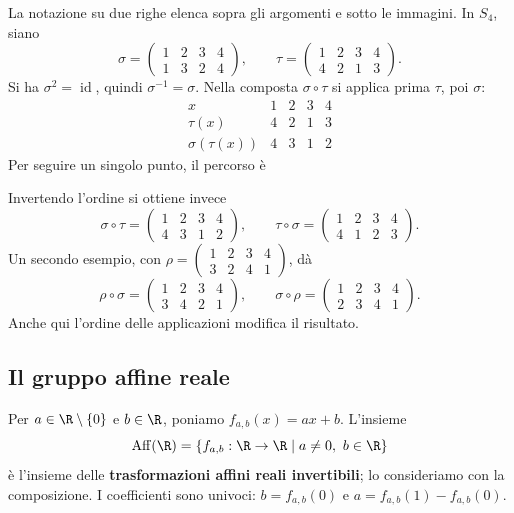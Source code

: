 \begin{esempio}
La notazione su due righe elenca sopra gli argomenti e sotto le immagini. In $S_4$, siano
\[
\sigma=\begin{pmatrix}1&2&3&4\\1&3&2&4\end{pmatrix},\qquad
\tau=\begin{pmatrix}1&2&3&4\\4&2&1&3\end{pmatrix}.
\]
Si ha $\sigma^2=\operatorname{id}$, quindi $\sigma^{-1}=\sigma$. Nella composta $\sigma\circ\tau$ si applica prima $\tau$, poi $\sigma$:
\[
\begin{array}{c|rrrr}
x&1&2&3&4\\\hline
\tau(x)&4&2&1&3\\
\sigma(\tau(x))&4&3&1&2
\end{array}
\]
Per seguire un singolo punto, il percorso è
\begin{center}
\end{center}
Invertendo l'ordine si ottiene invece
\[
\sigma\circ\tau=\begin{pmatrix}1&2&3&4\\4&3&1&2\end{pmatrix},\qquad
\tau\circ\sigma=\begin{pmatrix}1&2&3&4\\4&1&2&3\end{pmatrix}.
\]
Un secondo esempio, con $\rho=\left(\begin{smallmatrix}1&2&3&4\\3&2&4&1\end{smallmatrix}\right)$, dà
\[
\rho\circ\sigma=\begin{pmatrix}1&2&3&4\\3&4&2&1\end{pmatrix},\qquad
\sigma\circ\rho=\begin{pmatrix}1&2&3&4\\2&3&4&1\end{pmatrix}.
\]
Anche qui l'ordine delle applicazioni modifica il risultato.
\end{esempio}

\subsection{Il gruppo affine reale}
\begin{definizione}
Per $a\in\R\setminus\{0\}$ e $b\in\R$, poniamo $f_{a,b}(x)=ax+b$. L'insieme
\[
\operatorname{Aff}(\R)=\{f_{a,b}:\R\to\R\mid a\ne0,\ b\in\R\}
\]
è l'insieme delle \textbf{trasformazioni affini reali invertibili}; lo consideriamo con la composizione. I coefficienti sono univoci: $b=f_{a,b}(0)$ e $a=f_{a,b}(1)-f_{a,b}(0)$.
\end{definizione}

